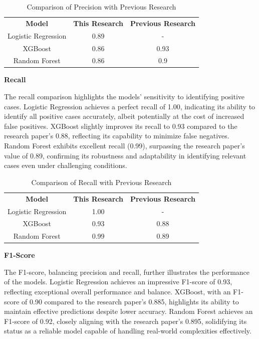 \documentclass[12pt]{report}
\begin{document}
    \begin{table}[h!]
        \centering
        \caption{Comparison of Precision with Previous Research}
        \begin{tabular}{|c|c|c|}
            \textbf{Model} & \textbf{This Research} & \textbf{Previous Research} \\
            Logistic Regression & 0.89 & - \\
            XGBoost & 0.86 & 0.93 \\
            Random Forest & 0.86 & 0.9 \\
        \end{tabular}
    \end{table}

    {\bfseries Recall}

    The recall comparison highlights the models' sensitivity to identifying positive cases. Logistic Regression achieves a perfect recall of 1.00, indicating its ability to identify all positive cases accurately, albeit potentially at the cost of increased false positives. XGBoost slightly improves its recall to 0.93 compared to the research paper's 0.88, reflecting its capability to minimize false negatives. Random Forest exhibits excellent recall (0.99), surpassing the research paper's value of 0.89, confirming its robustness and adaptability in identifying relevant cases even under challenging conditions.

    \begin{table}[h!]
        \centering
        \caption{Comparison of Recall with Previous Research}
        \begin{tabular}{|c|c|c|}
            \textbf{Model} & \textbf{This Research} & \textbf{Previous Research} \\
            Logistic Regression & 1.00 & - \\
            XGBoost & 0.93 & 0.88 \\
            Random Forest & 0.99 & 0.89 \\
        \end{tabular}
    \end{table}

    {\bfseries F1-Score}

    The F1-score, balancing precision and recall, further illustrates the performance of the models. Logistic Regression achieves an impressive F1-score of 0.93, reflecting exceptional overall performance and balance. XGBoost, with an F1-score of 0.90 compared to the research paper's 0.885, highlights its ability to maintain effective predictions despite lower accuracy. Random Forest achieves an F1-score of 0.92, closely aligning with the research paper's 0.895, solidifying its status as a reliable model capable of handling real-world complexities effectively.
\end{document}
